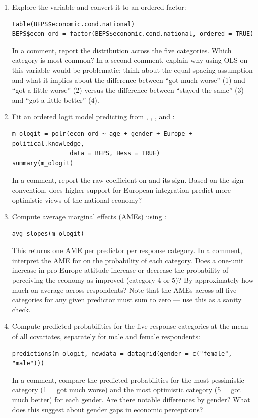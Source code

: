 \begin{enumerate}[label=\alph*)]

  \item Explore the  variable and convert it to an ordered factor:
  \begin{lstlisting}
table(BEPS$economic.cond.national)
BEPS$econ_ord = factor(BEPS$economic.cond.national, ordered = TRUE)
  \end{lstlisting}
  In a comment, report the distribution across the five categories. Which category is most common? In a second comment, explain why using OLS on this variable would be problematic: think about the equal-spacing assumption and what it implies about the difference between ``got much worse'' (1) and ``got a little worse'' (2) versus the difference between ``stayed the same'' (3) and ``got a little better'' (4).

  \item Fit an ordered logit model predicting  from , , , and :
  \begin{lstlisting}
m_ologit = polr(econ_ord ~ age + gender + Europe + political.knowledge,
                data = BEPS, Hess = TRUE)
summary(m_ologit)
  \end{lstlisting}
  In a comment, report the raw coefficient on  and its sign. Based on the sign convention, does higher support for European integration predict more optimistic views of the national economy?

  \item Compute average marginal effects (AMEs) using :
  \begin{lstlisting}
avg_slopes(m_ologit)
  \end{lstlisting}
  This returns one AME per predictor per response category. In a comment, interpret the AME for  on the probability of each category. Does a one-unit increase in pro-Europe attitude increase or decrease the probability of perceiving the economy as improved (category 4 or 5)? By approximately how much on average across respondents? Note that the AMEs across all five categories for any given predictor must sum to zero --- use this as a sanity check.

  \item Compute predicted probabilities for the five response categories at the mean of all covariates, separately for male and female respondents:
  \begin{lstlisting}
predictions(m_ologit, newdata = datagrid(gender = c("female", "male")))
  \end{lstlisting}
  In a comment, compare the predicted probabilities for the most pessimistic category (1 = got much worse) and the most optimistic category (5 = got much better) for each gender. Are there notable differences by gender? What does this suggest about gender gaps in economic perceptions?

\end{enumerate}

